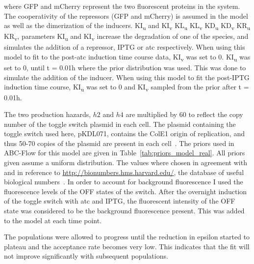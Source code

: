 \noindent where GFP and mCherry represent the two fluorescent proteins in the system. The cooperativity of the repressors (GFP and mCherry) is assumed in the model as well as the dimerization of the inducers. KI\textsubscript{u} and KI\textsubscript{v} KL\textsubscript{u} KL\textsubscript{v} KD\textsubscript{u} KD\textsubscript{v} KR\textsubscript{u} KR\textsubscript{v}, parameters KI\textsubscript{u} and KI\textsubscript{v} increase the degradation of one of the species, and simulates the addition of a repressor, IPTG or \acrshort{atc} respectively. When using this model to fit to the post-\acrshort{atc} induction time course data, KI\textsubscript{v} was set to 0. KI\textsubscript{u} was set to 0, until t = 0.01h where the prior distribution was used. This was done to simulate the addition of the inducer. When using this model to fit the post-IPTG induction time course, KI\textsubscript{u} was set to 0 and KI\textsubscript{v} sampled from the prior after t = 0.01h. 

The two production hazards, $h2$ and $h4$ are multiplied by 60 to reflect the copy number of the toggle switch plasmid in each cell. The plasmid containing the toggle switch used here, pKDL071, contains the ColE1 origin of replication, and thus 50-70 copies of the plasmid are present in each cell~\autocite{Milo:2010cz}. The priors used in ABC-Flow for this model are given in Table~\ref{tab:priors_model_real}. All priors given assume a uniform distribution. The values where chosen in agreement with~\autocite{Lillacci:2013hu} and in reference to \url{http://bionumbers.hms.harvard.edu/}, the database of useful biological numbers~\autocite{Milo:2010cz}. In order to account for background fluorescence I used the fluorescence levels of the OFF states of the switch. After the overnight induction of the toggle switch with \acrshort{atc} and IPTG, the fluorescent intensity of the OFF state was considered to be the background fluorescence present. This was added to the model at each time point. 



The populations were allowed to progress until the reduction in epsilon started to plateau and the acceptance rate becomes very low. This indicates that the fit will not improve significantly with subsequent populations.


